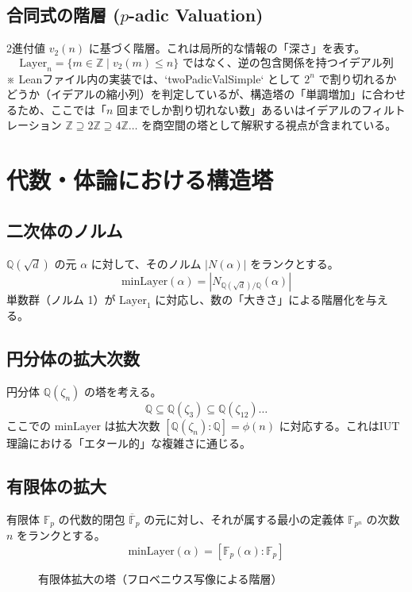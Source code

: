 \documentclass[a4paper,11pt]{ltjsarticle}
\theoremstyle{definition}
\newcommand{\Z}{\mathbb{Z}}
\newcommand{\Q}{\mathbb{Q}}
\newcommand{\F}{\mathbb{F}}
\newcommand{\Layer}[1]{\mathrm{Layer}_{#1}}
\newcommand{\MinLayer}{\mathrm{minLayer}}
\begin{document}
\subsection{合同式の階層 ($p$-adic Valuation)}
2進付値 $v_2(n)$ に基づく階層。これは局所的な情報の「深さ」を表す。
\[ \Layer{n} = \{ m \in \Z \mid v_2(m) \le n \} \text{ ではなく、逆の包含関係を持つイデアル列} \]
※ Leanファイル内の実装では、`twoPadicValSimple` として $2^n$ で割り切れるかどうか（イデアルの縮小列）を判定しているが、構造塔の「単調増加」に合わせるため、ここでは「$n$ 回までしか割り切れない数」あるいはイデアルのフィルトレーション $\Z \supseteq 2\Z \supseteq 4\Z \dots$ を商空間の塔として解釈する視点が含まれている。

\section{代数・体論における構造塔}

\subsection{二次体のノルム}
$\Q(\sqrt{d})$ の元 $\alpha$ に対して、そのノルム $|N(\alpha)|$ をランクとする。
\[ \MinLayer(\alpha) = |N_{\Q(\sqrt{d})/\Q}(\alpha)| \]
単数群（ノルム 1）が $\Layer{1}$ に対応し、数の「大きさ」による階層化を与える。

\subsection{円分体の拡大次数}
円分体 $\Q(\zeta_n)$ の塔を考える。
\[ \Q \subseteq \Q(\zeta_3) \subseteq \Q(\zeta_{12}) \dots \]
ここでの $\MinLayer$ は拡大次数 $[\Q(\zeta_n) : \Q] = \phi(n)$ に対応する。これはIUT理論における「エタール的」な複雑さに通じる。

\subsection{有限体の拡大}
有限体 $\F_p$ の代数的閉包 $\overline{\F}_p$ の元に対し、それが属する最小の定義体 $\F_{p^n}$ の次数 $n$ をランクとする。
\[ \MinLayer(\alpha) = [\F_p(\alpha) : \F_p] \]

\begin{figure}[h]
\centering
{}
\caption{有限体拡大の塔（フロベニウス写像による階層）}
\end{figure}
\end{document}
